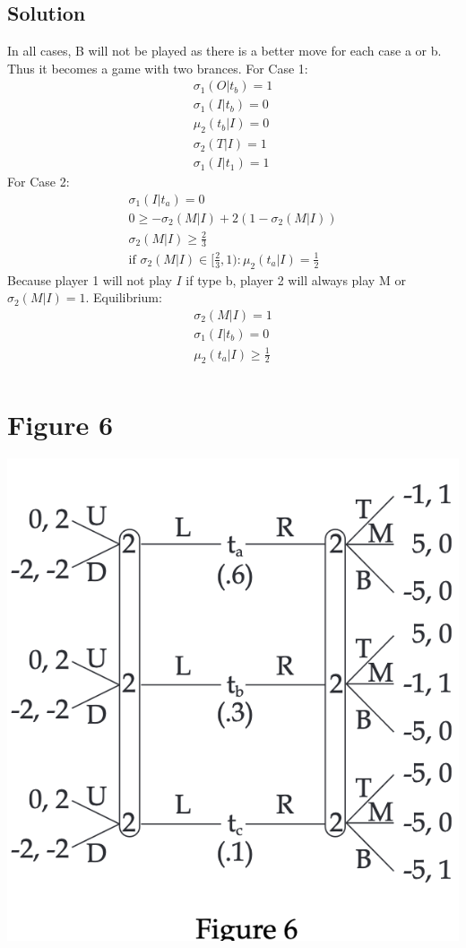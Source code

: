 \documentclass[10pt, a4paper]{article}
\begin{document}
    \subsection*{Solution}
      In all cases, B will not be played as there is a better move for each case a or b. Thus it becomes a game with two brances.
      For Case 1:
      \begin{gather*}
        \sigma_1(O|t_b) = 1 \\
        \sigma_1(I|t_b)=0 \\
        \mu_2(t_b|I) = 0 \\
        \sigma_2(T|I)=1 \\
        \sigma_1(I|t_1)=1
      \end{gather*}
      For Case 2:
      \begin{gather*}
        \sigma_1(I|t_a)=0 \\
        0\geq-\sigma_2(M|I)+2(1-\sigma_2(M|I))\\
        \sigma_2(M|I)\geq\frac{2}{3} \\
        \text{if $\sigma_2(M|I)\in[\frac{2}{3},1)$}:
        \mu_2(t_a|I)=\frac{1}{2}       
      \end{gather*}
      Because player 1 will not play $I$ if type b, player 2 will always play M or $\sigma_2(M|I)=1$.
      Equilibrium:
        \begin{gather*}
          \sigma_2(M|I)=1 \\
          \sigma_1(I|t_b)=0 \\
          \mu_2(t_a|I)\geq\frac{1}{2} \\
        \end{gather*}
  \section*{Figure 6}
    \begin{center}
      \includegraphics*{Fig6.png}
    \end{center}
\end{document}
